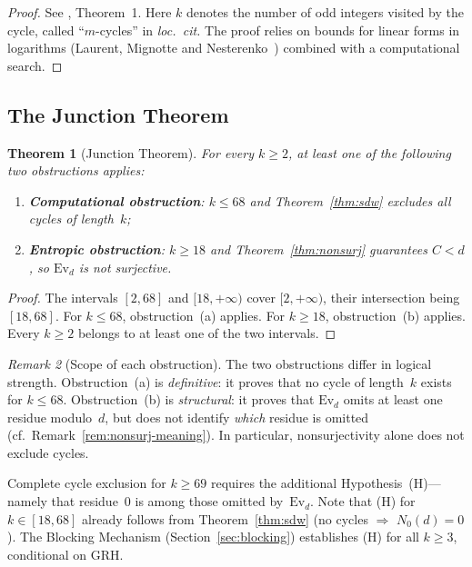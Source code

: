\documentclass[12pt, a4paper]{amsart}
\theoremstyle{plain}
\newtheorem{theorem}{Theorem}[section]
\theoremstyle{definition}
\theoremstyle{remark}
\newtheorem{remark}[theorem]{Remark}
\newcommand{\Ev}{\mathrm{Ev}}
\begin{document}
\begin{proof}
  See \cite{SimonsDeWeger2005}, Theorem~1.
  Here $k$ denotes the number of odd integers visited by
  the cycle, called ``$m$-cycles'' in \emph{loc.\ cit.}
  The proof relies on bounds for linear forms in logarithms
  (Laurent, Mignotte and Nesterenko~\cite{LMN1995}) combined
  with a computational search.
\end{proof}

\subsection{The Junction Theorem}

\begin{theorem}[Junction Theorem]\label{thm:junction}
  For every $k \geq 2$, at least one of the
  following two obstructions applies:
  \begin{enumerate}[label=\textup{(\alph*)}]
    \item \textbf{Computational obstruction}:
      $k \leq 68$ and Theorem~\ref{thm:sdw} excludes
      all cycles of length~$k$;
    \item \textbf{Entropic obstruction}:
      $k \geq 18$ and Theorem~\ref{thm:nonsurj} guarantees
      $C < d$, so $\Ev_d$ is not surjective.
  \end{enumerate}
\end{theorem}

\begin{proof}
  The intervals $[2, 68]$ and $[18, +\infty)$ cover
  $[2, +\infty)$, their intersection being $[18, 68]$.
  For $k \leq 68$, obstruction~(a) applies.
  For $k \geq 18$, obstruction~(b) applies.
  Every $k \geq 2$ belongs to at least one of the two
  intervals.
\end{proof}

\begin{remark}[Scope of each obstruction]\label{rem:junction-scope}
  The two obstructions differ in logical strength.
  Obstruction~(a) is \emph{definitive}: it proves that no
  cycle of length~$k$ exists for $k \leq 68$.
  Obstruction~(b) is \emph{structural}: it proves that
  $\Ev_d$ omits at least one residue modulo~$d$, but does
  not identify \emph{which} residue is omitted
  (cf.\ Remark~\ref{rem:nonsurj-meaning}).
  In particular, nonsurjectivity alone does not exclude
  cycles.

  Complete cycle exclusion for $k \geq 69$ requires
  the additional Hypothesis~\textup{(H)}---namely that
  residue~$0$ is among those omitted by~$\Ev_d$.
  Note that \textup{(H)} for $k \in [18, 68]$ already
  follows from Theorem~\ref{thm:sdw} (no cycles
  $\Rightarrow$ $N_0(d) = 0$).
  The Blocking Mechanism (Section~\ref{sec:blocking})
  establishes \textup{(H)} for all $k \geq 3$, conditional
  on GRH.
\end{remark}
\end{document}
